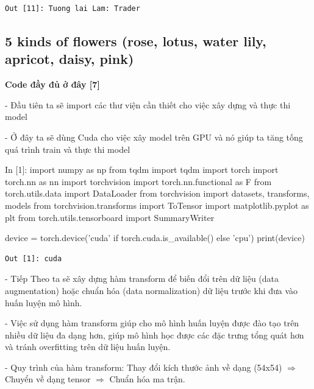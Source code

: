 \documentclass[12pt, a4paper]{article}
\begin{document}
\begin{verbatim}
Out [11]: Tuong lai Lam: Trader  
\end{verbatim}


\subsection{5 kinds of flowers (rose, lotus, water lily, apricot, daisy, pink)}
\par \textbf{Code đầy đủ ở đây [7]}
\par\hspace{0cm}- Đầu tiên ta sẽ import các thư viện cần thiết cho việc xây dựng và thực thi model
\par\hspace{0cm}- Ở đây ta sẽ dùng Cuda cho việc xây model trên GPU và nó giúp ta tăng tống quá trình train và thực thi model
\begin{python}
In [1]: import numpy as np
        from tqdm import tqdm
        import torch
        import torch.nn as nn
        import torchvision
        import torch.nn.functional as F
        from torch.utils.data import DataLoader
        from torchvision import datasets, transforms, models
        from torchvision.transforms import ToTensor
        import matplotlib.pyplot as plt
        from torch.utils.tensorboard import SummaryWriter
        
        
        device = torch.device('cuda' if torch.cuda.is_available() else 'cpu')
        print(device)
\end{python}
\begin{verbatim}
Out [1]: cuda

\end{verbatim}

\par - Tiếp Theo ta sẽ xây dựng hàm transform để biến đổi trên dữ liệu (data augmentation) hoặc chuẩn hóa (data normalization) dữ liệu trước khi đưa vào huấn luyện mô hình.
\par - Việc sử dụng hàm transform giúp cho mô hình huấn luyện được đào tạo trên nhiều dữ liệu
đa dạng hơn, giúp mô hình học được các đặc trưng tổng quát hơn và tránh overfitting trên dữ liệu huấn luyện.
\par - Quy trình của hàm transform: Thay đổi kích thước ảnh về dạng (54x54) $\Rightarrow$ Chuyển về dạng tensor $\Rightarrow$ Chuẩn hóa ma trận.
\end{document}
